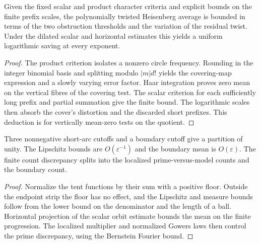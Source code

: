 \begin{lemma}\label{checked-twisted}
\leanok
Given the fixed scalar and product character criteria and explicit
bounds on the finite prefix scales, the polynomially twisted
Heisenberg average is bounded in terms of the two obstruction
thresholds and the variation of the residual twist. Under the
dilated scalar and horizontal estimates this yields a uniform
logarithmic saving at every exponent.
\end{lemma}
\begin{proof}
\leanok
The product criterion isolates a nonzero circle frequency.
Rounding in the integer binomial basis and splitting modulo
$|m|d!$ yields the covering-map expression and a slowly varying
error factor. Haar integration proves zero mean on the vertical
fibres of the covering test. The scalar criterion for each
sufficiently long prefix and partial summation give the finite bound.
The logarithmic scales then absorb the cover's distortion and the
discarded short prefixes. This deduction is for vertically mean-zero
tests on the quotient.
\end{proof}


\begin{lemma}\label{checked-selector-cutoffs}
\leanok
Three nonnegative short-arc cutoffs and a boundary cutoff give a
partition of unity. The Lipschitz bounds are $O(\varepsilon^{-1})$
and the boundary mean is $O(\varepsilon)$. The finite count
discrepancy splits into the localized prime-versus-model counts
and the boundary count.
\end{lemma}
\begin{proof}
\leanok
Normalize the tent functions by their sum with a positive floor.
Outside the endpoint strip the floor has no effect, and the
Lipschitz and measure bounds follow from the lower bound on the
denominator and the length of a ball. Horizontal projection of the
scalar orbit estimate bounds the mean on the finite progression.
The localized multiplier and normalized Gowers laws then control
the prime discrepancy, using the Bernstein Fourier bound.
\end{proof}


